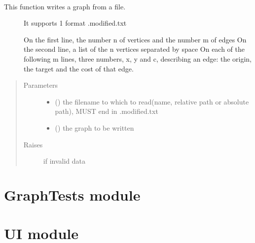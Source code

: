 \documentclass[letterpaper,10pt,english]{sphinxmanual}
\begin{document}
\begin{fulllineitems}
\label{\detokenize{Graph:Graph.write_graph}}~\begin{description}
\item[{This function writes a graph from a file.}] \leavevmode
It supports 1 format
.modified.txt

On the first line, the number n of vertices and the number m of edges
On the second line, a list of the n vertices separated by space
On each of the following m lines, three numbers, x, y and c, describing an edge: the origin, the target and the cost of that edge.

\end{description}
\begin{quote}\begin{description}
\item[{Parameters}] \leavevmode\begin{itemize}
\item {} 
 () \textendash{} the filename to which to read(name, relative path or absolute path), MUST end in .modified.txt

\item {} 
 ({\hyperref[\detokenize{Graph:Graph.Graph}]{}}) \textendash{} the graph to be written

\end{itemize}

\item[{Raises}] \leavevmode
{} \textendash{} if invalid data

\end{description}\end{quote}

\end{fulllineitems}



\section{GraphTests module}
\label{\detokenize{GraphTests:graphtests-module}}\label{\detokenize{GraphTests::doc}}

\section{UI module}
\label{\detokenize{UI:module-UI}}\label{\detokenize{UI:ui-module}}\label{\detokenize{UI::doc}}
\end{document}
